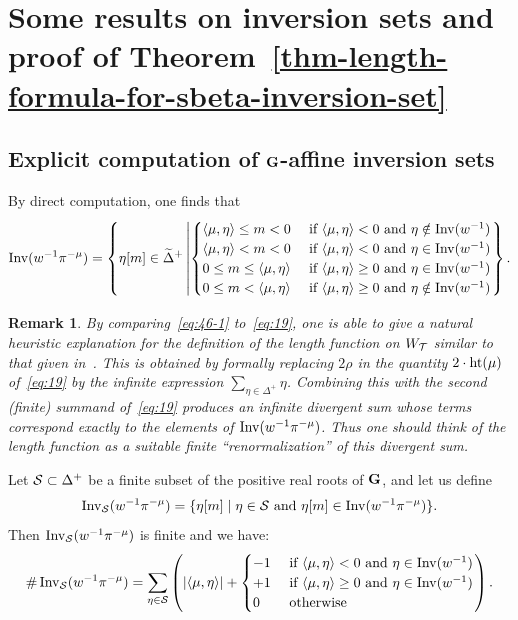 \documentclass[10pt]{amsart}
\newtheorem{rema}[theo]{Remark}
\newcommand{\textif}{\text{ if }}\newcommand{\textand}{\text{ and }}\newcommand{\textor}{\text{ or }}\newcommand{\suchthat}{\mid}
\begin{document}
\section{Some results on inversion sets and proof of Theorem~\ref{thm-length-formula-for-sbeta-inversion-set}}

\subsection{Explicit computation of \texorpdfstring{$\mathbf{G}$}{G}-affine inversion sets}

By direct computation, one finds that
\begin{equation}\label{eq:46-1}
\Inv(w^{-1}\pi^{-\mu}) = \left\{ \eta[m]\in\tDelta^+ \,\middle|
\begin{cases}
\langle \mu, \eta \rangle \leq m < 0 & \textif \langle \mu, \eta \rangle < 0 \textand \eta \notin \Inv(w^{-1}) \\
\langle \mu, \eta \rangle < m < 0 & \textif \langle \mu, \eta \rangle < 0 \textand \eta \in \Inv(w^{-1}) \\
0 \leq m \leq \langle \mu, \eta \rangle & \textif \langle \mu, \eta \rangle \geq 0 \textand \eta \in \Inv(w^{-1}) \\
0 \leq m < \langle \mu, \eta \rangle & \textif \langle \mu, \eta \rangle \geq 0 \textand \eta \notin \Inv(w^{-1})
\end{cases}
\right\}.
\end{equation}

\begin{rema}
By comparing~\eqref{eq:46-1} to~\eqref{eq:19}, one is able to give a natural heuristic explanation for the definition of the length function on $W_{\mathcal{T}}$ similar to that given in~\cite[\S2.11]{K}. This is obtained by formally replacing $2\rho$ in the quantity $2\cdot\operatorname{ht}(\mu)$ of~\eqref{eq:19} by the infinite expression $\sum_{\eta\in\Delta^+} \eta$. Combining this with the second (finite) summand of~\eqref{eq:19} produces an infinite divergent sum whose terms correspond exactly to the elements of $\operatorname{Inv}(w^{-1}\pi^{-\mu})$. Thus one should think of the length function as a suitable finite ``renormalization'' of this divergent sum.
\end{rema}

Let $\mathcal{S} \subset \Delta^+$ be a finite subset of the positive real roots of $\mathbf{G}$, and let us define
\begin{align*}
\Inv_{\cS}(w^{-1} \pi^{-\mu}) = \{ \eta[m] \suchthat \eta \in \cS \textand \eta[m] \in \Inv(w^{-1} \pi^{-\mu}) \}.
\end{align*}
Then $\operatorname{Inv}_{\mathcal{S}}(w^{-1} \pi^{-\mu})$ is finite and we have:
\begin{equation}\label{E:invS}
\# \Inv_{\cS}(w^{-1} \pi^{-\mu}) = \sum_{\eta \in \cS} \left(|\langle \mu, \eta \rangle| +
\begin{cases}
-1 & \textif \langle \mu, \eta \rangle < 0 \textand \eta \in \Inv(w^{-1}) \\
+1 & \textif \langle \mu, \eta \rangle \geq 0 \textand \eta \in \Inv(w^{-1}) \\
0 & \text{ otherwise}
\end{cases}
\right).
\end{equation}
\end{document}
